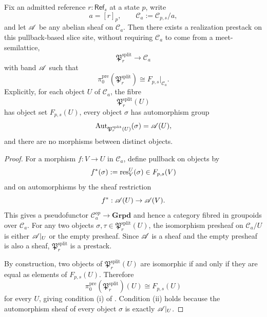 \begin{proposition}\label{prop:split-realization-prestack}
Fix an admitted reference $r:\mathsf{Ref}_s$ at a state $p$, write
\[
a=[r]_p,
\qquad
\mathcal C_a:=\mathcal C_{p,s}/a,
\]
and let $\mathscr{A}$ be any abelian sheaf on $\mathcal C_a$. Then there exists a realization prestack on this pullback-based slice site, without requiring $\mathcal C_a$ to come from a meet-semilattice,
\[
\mathfrak P_r^{\mathrm{split}}\to \mathcal C_a
\]
with band $\mathscr{A}$ such that
\[
\pi_0^{\mathrm{pre}}(\mathfrak P_r^{\mathrm{split}})
\cong
F_{p,s}|_{\mathcal C_a}.
\]
Explicitly, for each object $U$ of $\mathcal C_a$, the fibre
\[
\mathfrak P_r^{\mathrm{split}}(U)
\]
has object set $F_{p,s}(U)$, every object $\sigma$ has automorphism group
\[
\mathrm{Aut}_{\mathfrak P_r^{\mathrm{split}}(U)}(\sigma)=\mathscr{A}(U),
\]
and there are no morphisms between distinct objects.
\end{proposition}

\begin{proof}
For a morphism $f:V\to U$ in $\mathcal C_a$, define pullback on objects by
\[
f^*(\sigma):=\mathrm{res}_V^U(\sigma)\in F_{p,s}(V)
\]
and on automorphisms by the sheaf restriction
\[
f^*:\mathscr{A}(U)\to \mathscr{A}(V).
\]
This gives a pseudofunctor $\mathcal C_a^{op}\to \mathbf{Grpd}$ and hence a category fibred in groupoids over $\mathcal C_a$. For any two objects $\sigma,\tau\in \mathfrak P_r^{\mathrm{split}}(U)$, the isomorphism presheaf on $\mathcal C_a/U$ is either $\mathscr{A}|_U$ or the empty presheaf. Since $\mathscr{A}$ is a sheaf and the empty presheaf is also a sheaf, $\mathfrak P_r^{\mathrm{split}}$ is a prestack.

By construction, two objects of $\mathfrak P_r^{\mathrm{split}}(U)$ are isomorphic if and only if they are equal as elements of $F_{p,s}(U)$. Therefore
\[
\pi_0^{\mathrm{pre}}(\mathfrak P_r^{\mathrm{split}})(U)\cong F_{p,s}(U)
\]
for every $U$, giving condition \textup{(i)} of . Condition \textup{(ii)} holds because the automorphism sheaf of every object $\sigma$ is exactly $\mathscr{A}|_U$.
\end{proof}

